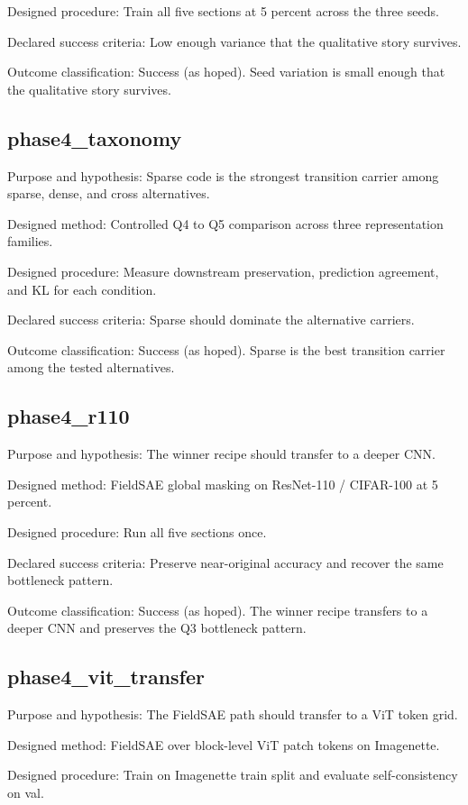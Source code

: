 \documentclass[11pt]{article}
\begin{document}
Designed procedure: Train all five sections at 5 percent across the three seeds.


Declared success criteria: Low enough variance that the qualitative story survives.


Outcome classification: Success (as hoped). Seed variation is small enough that the qualitative story survives.


\subsection{phase4\_taxonomy}
Purpose and hypothesis: Sparse code is the strongest transition carrier among sparse, dense, and cross alternatives.


Designed method: Controlled Q4 to Q5 comparison across three representation families.


Designed procedure: Measure downstream preservation, prediction agreement, and KL for each condition.


Declared success criteria: Sparse should dominate the alternative carriers.


Outcome classification: Success (as hoped). Sparse is the best transition carrier among the tested alternatives.


\subsection{phase4\_r110}
Purpose and hypothesis: The winner recipe should transfer to a deeper CNN.


Designed method: FieldSAE global masking on ResNet-110 / CIFAR-100 at 5 percent.


Designed procedure: Run all five sections once.


Declared success criteria: Preserve near-original accuracy and recover the same bottleneck pattern.


Outcome classification: Success (as hoped). The winner recipe transfers to a deeper CNN and preserves the Q3 bottleneck pattern.


\subsection{phase4\_vit\_transfer}
Purpose and hypothesis: The FieldSAE path should transfer to a ViT token grid.


Designed method: FieldSAE over block-level ViT patch tokens on Imagenette.


Designed procedure: Train on Imagenette train split and evaluate self-consistency on val.
\end{document}
